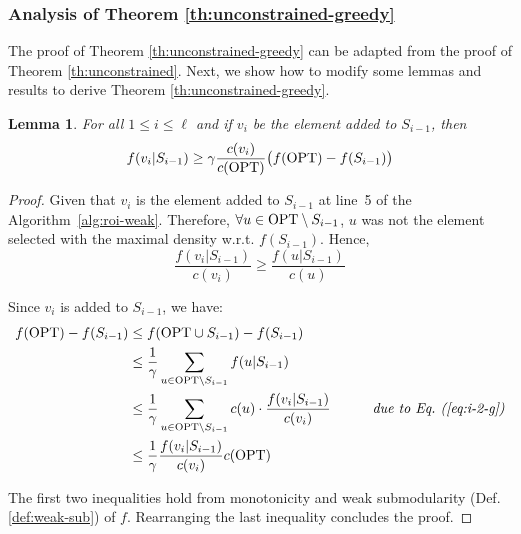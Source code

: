 \documentclass[10pt]{article} %
\newtheorem{lemma}[theorem]{Lemma}
\theoremstyle{remark}
\newcommand{\OPT}{{\rm OPT}}
\begin{document}
\subsubsection{Analysis of Theorem \ref{th:unconstrained-greedy}}
The proof of Theorem \ref{th:unconstrained-greedy} can be adapted from the proof of Theorem \ref{th:unconstrained}. Next, we show how to modify some lemmas and results to derive Theorem \ref{th:unconstrained-greedy}.





\begin{lemma}
\label{lem:marginal-gain-g}
For all $1 \leq i \leq \ell$ and if $v_i$ be the element added to $S_{i-1}$, then
\[ 
f(v_i|S_{i-1}) \geq \gamma \frac{c(v_i)}{c(\OPT)} \big ( f(\OPT) - f(S_{i-1}) \big ) 
\]
\end{lemma}

\begin{proof} 
Given that $v_i$ is the element added to $S_{i-1}$ at line~5 of the Algorithm~\ref{alg:roi-weak}. Therefore,
$\forall u\in \OPT \setminus S_{i-1}$, $u$ was not the element selected with the maximal density w.r.t.  $f(S_{i-1})$. Hence, 
\begin{equation}
\frac{f(v_i|S_{i-1})}{c(v_i)}\geq \frac{f(u|S_{i-1})}{c(u)}
\label{eq:i-2-g}
\end{equation}

Since $v_i$ is added to $S_{i-1}$, we have: 
\begin{align*}
     f(\OPT)-f(S_{i-1}) &\leq f(\OPT \cup S_{i-1})-f(S_{i-1})\\
     &\leq \frac{1}{\gamma} \sum_{u\in \OPT \setminus S_{i-1}} f(u|S_{i-1})  \\
    &\leq \frac{1}{\gamma} \sum_{u\in \OPT \setminus S_{i-1}} c(u) \cdot \frac{f(v_i|S_{i-1})}{c(v_i)}  \quad\quad\quad\mbox{\it  due to Eq.~(\ref{eq:i-2-g})} \\
    &\leq \frac{1}{\gamma} \frac{f(v_i|S_{i-1})}{c(v_i)} c(\OPT)
\end{align*}

The first two inequalities hold from monotonicity and weak submodularity (Def. \ref{def:weak-sub}) of $f$. Rearranging the last inequality concludes the proof.  
\end{proof}
\end{document}
